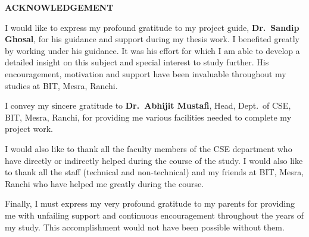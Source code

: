 \documentclass[a4paper,12pt]{report}
\newcommand{\deptshort}{CSE}
\newcommand{\guidename}{Dr.\ Sandip Ghosal}
\newcommand{\hodname}{Dr.\ Abhijit Mustafi}
\begin{document}
\endgroup

\clearpage
{}
{}
\begingroup
    \fontsize{12}{16}\selectfont

    \vspace*{0.8cm}
    \begin{center}
        {\fontsize{18}{22}\selectfont \textbf{ACKNOWLEDGEMENT}\par}
    \end{center}

    \vspace{1.0cm}

    \noindent
    I would like to express my profound gratitude to my project guide, \textbf{\guidename}, for his guidance and support during my thesis work. I benefited greatly by working under his guidance. It was his effort for which I am able to develop a detailed insight on this subject and special interest to study further. His encouragement, motivation and support have been invaluable throughout my studies at BIT, Mesra, Ranchi.

    \vspace{0.35cm}

    \noindent
    I convey my sincere gratitude to \textbf{\hodname}, Head, Dept.\ of \deptshort, BIT, Mesra, Ranchi, for providing me various facilities needed to complete my project work.

    \vspace{0.35cm}

    \noindent
    I would also like to thank all the faculty members of the \deptshort{} department who have directly or indirectly helped during the course of the study. I would also like to thank all the staff (technical and non-technical) and my friends at BIT, Mesra, Ranchi who have helped me greatly during the course.

    \vspace{0.35cm}

    \noindent
    Finally, I must express my very profound gratitude to my parents for providing me with unfailing support and continuous encouragement throughout the years of my study. This accomplishment would not have been possible without them.

    \vspace{0.35cm}
\end{document}
